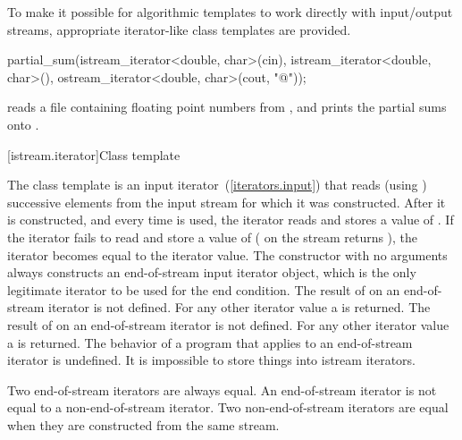 \pnum
To make it possible for algorithmic templates to work directly with input/output streams, appropriate
iterator-like
class templates
are provided.

\enterexample
\begin{codeblock}
partial_sum(istream_iterator<double, char>(cin),
  istream_iterator<double, char>(),
  ostream_iterator<double, char>(cout, "@\textbackslash@n"));
\end{codeblock}

reads a file containing floating point numbers from
,
and prints the partial sums onto
.
\exitexample

[istream.iterator]{Class template }

\pnum
{}%
The class template
is an input iterator~(\ref{iterators.input}) that
reads (using
)
successive elements from the input stream for which it was constructed.
After it is constructed, and every time
\tcode{++}
is used, the iterator reads and stores a value of
.
If the iterator fails to read and store a value of 
(
on the stream returns
),
the iterator becomes equal to the
iterator value.
The constructor with no arguments
always constructs
an end-of-stream input iterator object, which is the only legitimate iterator to be used
for the end condition.
The result of
on an end-of-stream iterator is not defined.
For any other iterator value a
is returned.
The result of
on an end-of-stream iterator is not defined.
For any other iterator value a
is returned.
The behavior of a program that applies  to an end-of-stream
iterator is undefined.
It is impossible to store things into istream iterators.

\pnum
Two end-of-stream iterators are always equal.
An end-of-stream iterator is not
equal to a non-end-of-stream iterator.
Two non-end-of-stream iterators are equal when they are constructed from the same stream.

